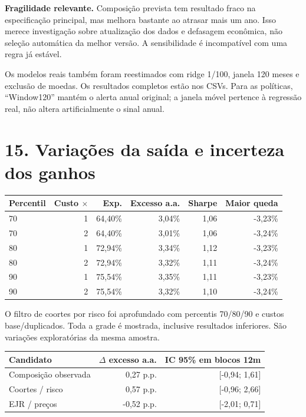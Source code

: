 \documentclass[11pt,a4paper]{article}
\begin{document}
\textbf{Fragilidade relevante.} Composição prevista tem resultado fraco na especificação principal, mas melhora bastante ao atrasar mais um ano. Isso merece investigação sobre atualização dos dados e defasagem econômica, não seleção automática da melhor versão. A sensibilidade é incompatível com uma regra já estável.

Os modelos reais também foram reestimados com ridge 1/100, janela 120 meses e exclusão de moedas. Os resultados completos estão nos CSVs. Para as políticas, ``Window120'' mantém o alerta anual original; a janela móvel pertence à regressão real, não altera artificialmente o sinal anual.

\clearpage
\section*{15. Variações da saída e incerteza dos ganhos}
\small\begin{center}\begin{tabular}{lrrrrr}\toprule Percentil & Custo $\times$ & Exp. & Excesso a.a. & Sharpe & Maior queda\\\midrule 
70 & 1 & 64,40\% & 3,04\% & 1,06 & -3,23\%\\
70 & 2 & 64,40\% & 3,01\% & 1,06 & -3,24\%\\
80 & 1 & 72,94\% & 3,34\% & 1,12 & -3,23\%\\
80 & 2 & 72,94\% & 3,32\% & 1,11 & -3,24\%\\
90 & 1 & 75,54\% & 3,35\% & 1,11 & -3,23\%\\
90 & 2 & 75,54\% & 3,32\% & 1,10 & -3,24\%\\\bottomrule\end{tabular}\end{center}\normalsize

O filtro de coortes por risco foi aprofundado com percentis 70/80/90 e custos base/duplicados. Toda a grade é mostrada, inclusive resultados inferiores. São variações exploratórias da mesma amostra.
\small\begin{center}\begin{tabular}{lrr}\toprule Candidato & $\Delta$ excesso a.a. & IC 95\% em blocos 12m\\\midrule 
Composição observada & 0,27 p.p. & [-0,94; 1,61]\\
Coortes / risco & 0,57 p.p. & [-0,96; 2,66]\\
EJR / preços & -0,52 p.p. & [-2,01; 0,71]\\\bottomrule\end{tabular}\end{center}\normalsize
\end{document}
